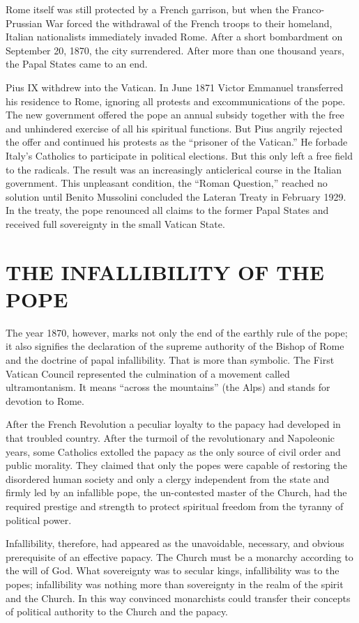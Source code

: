 Rome itself was still protected by a French garrison, but when the Franco-Prussian War forced the
withdrawal of the French troops to their homeland, Italian nationalists immediately invaded Rome.
After a short bombardment on September 20, 1870, the city surrendered. After more than one thousand
years, the Papal States came to an end.

Pius IX withdrew into the Vatican. In June 1871 Victor Emmanuel transferred his residence to Rome,
ignoring all protests and excommunications of the pope. The new government offered the pope an
annual subsidy together with the free and unhindered exercise of all his spiritual functions. But
Pius angrily rejected the offer and continued his protests as the “prisoner of the Vatican.” He
forbade Italy’s Catholics to participate in political elections. But this only left a free field to
the radicals. The result was an increasingly anticlerical course in the Italian government. This
unpleasant condition, the “Roman Question,” reached no solution until Benito Mussolini concluded the
Lateran Treaty in February 1929. In the treaty, the pope renounced all claims to the former Papal
States and received full sovereignty in the small Vatican State.

\section{THE INFALLIBILITY OF THE POPE}

The year 1870, however, marks not only the end of the earthly rule of the pope; it also signifies
the declaration of the supreme authority of the Bishop of Rome and the doctrine of papal
infallibility. That is more than symbolic. The First Vatican Council represented the culmination of
a movement called ultramontanism. It means “across the mountains” (the Alps) and stands for devotion
to Rome.

After the French Revolution a peculiar loyalty to the papacy had developed in that troubled country.
After the turmoil of the revolutionary and Napoleonic years, some Catholics extolled the papacy as
the only source of civil order and public morality. They claimed that only the popes were capable of
restoring the disordered human society and only a clergy independent from the state and firmly led
by an infallible pope, the un-contested master of the Church, had the required prestige and strength
to protect spiritual freedom from the tyranny of political power.

Infallibility, therefore, had appeared as the unavoidable, necessary, and obvious prerequisite of an
effective papacy. The Church must be a monarchy according to the will of God. What sovereignty was
to secular kings, infallibility was to the popes; infallibility was nothing more than sovereignty in
the realm of the spirit and the Church. In this way convinced monarchists could transfer their
concepts of political authority to the Church and the papacy.

